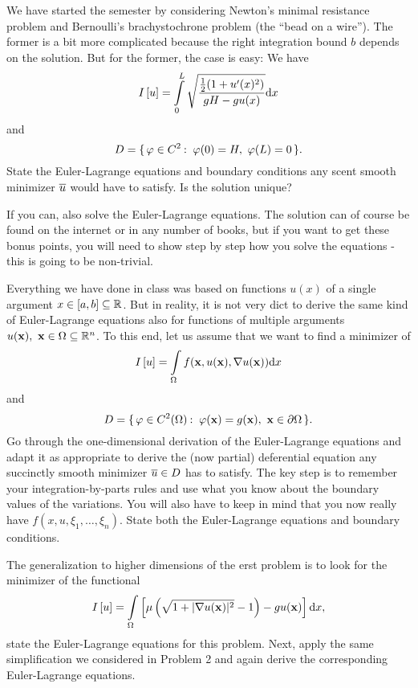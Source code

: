 \documentclass[12pt]{memoir}
\begin{document}
\begin{ptcbr}

\end{ptcbr}

\begin{Ej}
    We have started the semester by considering Newton's
    minimal resistance problem and Bernoulli's brachystochrone problem (the ``bead on a wire''). The former is
    a bit more complicated because the right integration bound $ b$ depends on the solution. But for the former,
    the case is easy: We have
    $$I\bonj{u}=\int\limits_0^L\sqrt{\frac{\half(1+u'(x)^2)}{gH-gu(x)}}\dd x$$
    and
    $$D=\set{\vf\in C^2\:\ \vf(0)=H,\ \vf(L)=0}.$$
    State the Euler-Lagrange equations and boundary conditions any scent smooth minimizer $\overline u$ would
have to satisfy. Is the solution unique?
\end{Ej}

\begin{ptcbr}
   
\end{ptcbr}

\begin{nonum-Ej}
    If you can, also solve the Euler-Lagrange equations. The solution can of course be found on the internet
or in any number of books, but if you want to get these bonus points, you will need to show step by step
how you solve the equations - this is going to be non-trivial.
\end{nonum-Ej}

\begin{Ej}
    Everything we have done in class was based on functions $u(x)$ of a
single argument $x\in\left\lbrack a,b\right\rbrack\subseteq\mathbb{R}$. But in reality, it is not very dict to derive the same kind of Euler-Lagrange
equations also for functions of multiple arguments $u(\mathbf{x}),\ \mathbf{x}\in\Omega\subseteq\mathbb{R}^n$.
To this end, let us assume that we want to ﬁnd a minimizer of
$$I\left\lbrack u\right\rbrack=\int\limits_\Omega f(\mathbf{x},u(\mathbf{x}),\nabla u(\mathbf{x}))\dd x$$
and
$$D=\{\,\varphi\in C^2(\Omega)\mathbin{:}\ \varphi(\mathbf{x})=g(\mathbf{x}),\ \mathbf{x}\in\partial\Omega\,\}.$$
Go through the one-dimensional derivation of the Euler-Lagrange equations and adapt it as appropriate to
derive the (now partial) deferential equation any succinctly smooth minimizer $\overline u\in D$ has to satisfy. The
key step is to remember your integration-by-parts rules and use what you know about the boundary values
of the variations. You will also have to keep in mind that you now really have $f(x, u,\xi_1,\dots,\xi_n)$.
State both the Euler-Lagrange equations and boundary conditions.
\end{Ej}

\begin{Ej}
    The generalization to higher dimensions of the erst problem is to
look for the minimizer of the functional
$$I\left\lbrack u\right\rbrack=\int\limits_\Omega\left\lbrack\mu\left(\sqrt{1+|\nabla u(\mathbf{x})|^2}-1\right)-gu(\mathbf{x})\right\rbrack\dd x,$$
state the Euler-Lagrange equations for this problem.
Next, apply the same simplification we considered in Problem 2 and again derive the corresponding
Euler-Lagrange equations.
\end{Ej}
\end{document}
